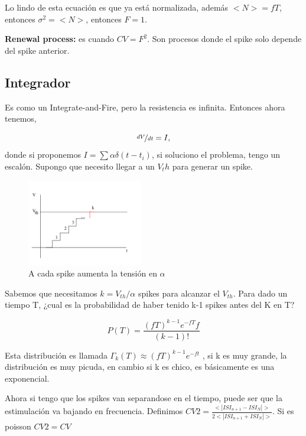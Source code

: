 Lo lindo de esta ecuación es que ya está normalizada, además $<N> = fT$, entonces $\sigma^2=<N>$, entonces $F=1$.


{\bf Renewal process:} es cuando $CV=F^2$. Son procesos donde el  spike solo depende del spike anterior.


\subsection{Integrador}

Es como  un Integrate-and-Fire, pero la resistencia es infinita. Entonces ahora tenemos,

\begin{equation}
	\nicefrac{dV}{dt}= I,
\end{equation}
donde si proponemos $I=\sum \alpha \delta(t-t_i)$, si soluciono el problema, tengo un escalón. Supongo que necesito llegar a un $V_th$ para generar un spike. 

\begin{figure}[H]
	\centering
	\includegraphics[width=0.45\textwidth]{2-2.png}
	\caption{A cada spike aumenta la tensión en $\alpha$}
\end{figure}

Sabemos que necesitamos $k=V_{th}/\alpha$ spikes para alcanzar el $V_{th}$. Para dado un tiempo T, ¿cual es la probabilidad de haber tenido k-1 spikes antes del K en T?

\begin{equation}
	P(T)=\frac{(fT)^{k-1} e^{-fT}f}{(k-1)!}
\end{equation}

Esta distribución es llamada $\Gamma_k(T)\approx (fT)^{k-1}e^{-ft}$ , si k es muy grande, la  distribución es muy picuda, en cambio si k es chico, es básicamente es una exponencial.


Ahora si tengo que los spikes van separandose en el tiempo, puede ser que la estimulación va bajando en frecuencia. Definimos $CV2= \frac{<|ISI_{n+1}-ISI_N|>}{2<|ISI_{n+1}+ISI_N|>}$. Si es poisson $CV2=CV$



